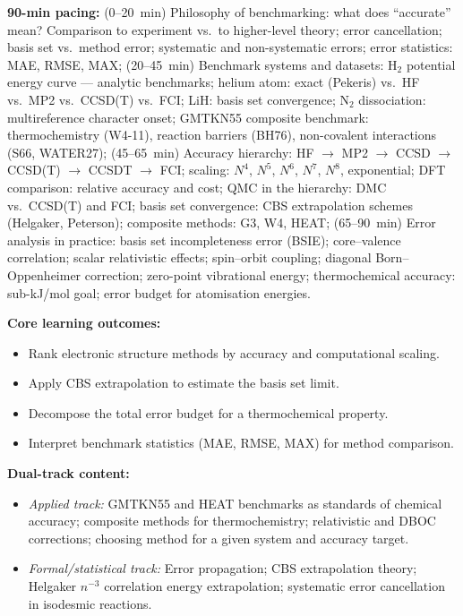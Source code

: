 \documentclass[11pt,a4paper]{article}
\begin{document}
\begin{tcolorbox}[modulebox, title={Module~II.1 / L11: Benchmark Systems and Accuracy Hierarchies}]
\textbf{90-min pacing:} (0--20~min) Philosophy of benchmarking: what does ``accurate'' mean?
Comparison to experiment vs.\ to higher-level theory; error cancellation; basis set vs.\
method error; systematic and non-systematic errors; error statistics: MAE, RMSE, MAX;
(20--45~min) Benchmark systems and datasets:
H$_2$ potential energy curve --- analytic benchmarks;
helium atom: exact (Pekeris) vs.\ HF vs.\ MP2 vs.\ CCSD(T) vs.\ FCI;
LiH: basis set convergence; N$_2$ dissociation: multireference character onset;
GMTKN55 composite benchmark: thermochemistry (W4-11), reaction barriers (BH76),
non-covalent interactions (S66, WATER27);
(45--65~min) Accuracy hierarchy:
HF $\to$ MP2 $\to$ CCSD $\to$ CCSD(T) $\to$ CCSDT $\to$ FCI;
scaling: $N^4$, $N^5$, $N^6$, $N^7$, $N^8$, exponential;
DFT comparison: relative accuracy and cost;
QMC in the hierarchy: DMC vs.\ CCSD(T) and FCI;
basis set convergence: CBS extrapolation schemes (Helgaker, Peterson);
composite methods: G3, W4, HEAT;
(65--90~min) Error analysis in practice: basis set incompleteness error (BSIE);
core--valence correlation; scalar relativistic effects; spin--orbit coupling;
diagonal Born--Oppenheimer correction; zero-point vibrational energy;
thermochemical accuracy: sub-kJ/mol goal; error budget for atomisation energies.

\medskip\textbf{Core learning outcomes:}
\begin{itemize}[leftmargin=1.4em,topsep=2pt,itemsep=1pt]
  \item Rank electronic structure methods by accuracy and computational scaling.
  \item Apply CBS extrapolation to estimate the basis set limit.
  \item Decompose the total error budget for a thermochemical property.
  \item Interpret benchmark statistics (MAE, RMSE, MAX) for method comparison.
\end{itemize}

\medskip\textbf{Dual-track content:}
\begin{itemize}[leftmargin=1.4em,topsep=2pt,itemsep=1pt]
  \item \textit{Applied track:} GMTKN55 and HEAT benchmarks as standards of chemical accuracy;
    composite methods for thermochemistry; relativistic and DBOC corrections; choosing
    method for a given system and accuracy target.
  \item \textit{Formal/statistical track:} Error propagation; CBS extrapolation theory;
    Helgaker $n^{-3}$ correlation energy extrapolation; systematic error cancellation
    in isodesmic reactions.
\end{itemize}


\end{tcolorbox}
\end{document}
